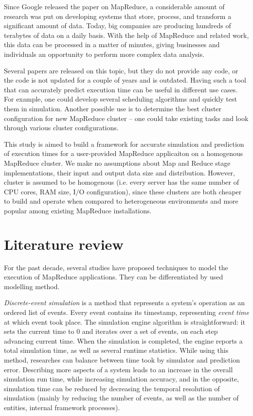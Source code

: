 \documentclass[conference]{IEEEtran} \IEEEoverridecommandlockouts
\begin{document}
    Since Google released the paper \cite{google_mapreduce} on MapReduce, a considerable amount of
    research was put on developing systems that store, process, and transform a
    significant amount of data. Today, big companies are producing hundreds of
    terabytes of data on a daily basis. With the help of MapReduce and related
    work, this data can be processed in a matter of minutes, giving businesses
    and individuals an opportunity to perform more complex data analysis. 

    Several papers are released on this topic, but they do not provide any
    code, or the code is not updated for a couple of years and is outdated.
    Having such a tool that can accurately predict execution time can be useful
    in different use cases. For example, one could develop several scheduling
    algorithms and quickly test them in simulation. Another possible use is to
    determine the best cluster configuration for new MapReduce cluster -- one
    could take existing tasks and look through various cluster configurations.

    This study is aimed to build a framework for accurate simulation and
    prediction of execution times for a user-provided MapReduce applicaiton on
    a homogenous MapReduce cluster. We make no assumptions about Map and Reduce
    stage implementations, their input and output data size and distribution.
    However, cluster is assumed to be homogenous (i.e. every server has the
    same number of CPU cores, RAM size, I/O configuration), since these
    clusters are both cheaper to build and operate when compared to
    heterogeneous environments and more popular among existing MapReduce
    installations.

    \section{Literature review} 
    \label{literature_review} 

    For the past decade, several studies have proposed techniques to model the
    execution of MapReduce applications. They can be differentiated by used
    modelling method. 

    \textit{Discrete-event simulation} is a method that represents a system's
    operation as an ordered list of events. Every event contains its timestamp,
    representing \textit{event time} at which event took place. The simulation
    engine algorithm is straightforward: it sets the current time to 0 and
    iterates over a set of events, on each step advancing current time. When
    the simulation is completed, the engine reports a total simulation time, as
    well as several runtime statistics. While using this method, researches can
    balance between time took by simulator and prediction error. Describing
    more aspects of a system leads to an increase in the overall simulation run
    time, while increasing simulation accuracy, and in the opposite, simulation
    time can be reduced by decreasing the temporal resolution of simulation
    (mainly by reducing the number of events, as well as the number of
    entities, internal framework processes).
\end{document}

